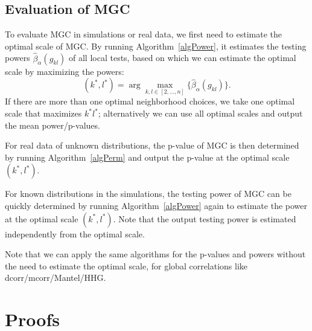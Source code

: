 \documentclass[11pt]{article}
\begin{document}
\subsection{Evaluation of MGC}
\label{appen:eval}

To evaluate MGC in simulations or real data, we first need to estimate the optimal scale of MGC. By running Algorithm~\ref{algPower}, it estimates the testing powers $\hat{\beta}_{\alpha}(g_{kl})$ of all local tests, based on which we can estimate the optimal scale by maximizing the powers:
\begin{equation}
\label{power}
(k^{*},l^{*})=\arg\max_{k,l \in [2,\ldots,n] }\{\hat{\beta}_{\alpha}(g_{kl})\}.
\end{equation}
If there are more than one optimal neighborhood choices, we take one optimal scale that maximizes $k^{*}l^{*}$; alternatively we can use all optimal scales and output the mean power/p-values. 

For real data of unknown distributions, the p-value of MGC is then determined by running Algorithm~\ref{algPerm} and output the p-value at the optimal scale $(k^{*},l^{*})$.

For known distributions in the simulations, the testing power of MGC can be quickly determined by running Algorithm~\ref{algPower} again to estimate the power at the optimal scale $(k^{*},l^{*})$. Note that the output testing power is estimated independently from the optimal scale.

Note that we can apply the same algorithms for the p-values and powers without the need to estimate the optimal scale, for global correlations like dcorr/mcorr/Mantel/HHG.

\section{Proofs}
\label{appen:proofs}

\end{document}
